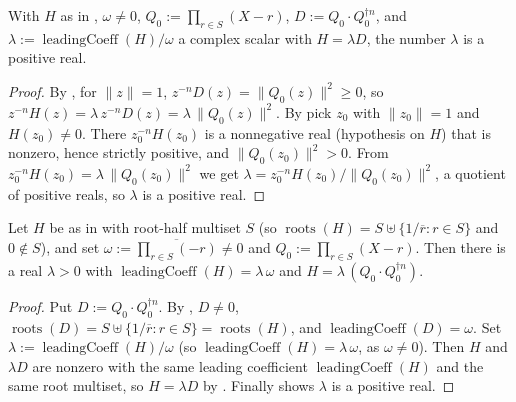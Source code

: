 \begin{lemma}
    \label{lem:fr-positive-multiple-lambda}
    \leanok
    With $H$ as in , $\omega \neq 0$, $Q_0 := \prod_{r\in S}
    (X-r)$, $D := Q_0\cdot Q_0^{\dagger n}$, and $\lambda :=
    \operatorname{leadingCoeff}(H)/\omega$ a complex scalar with $H = \lambda D$,
    the number $\lambda$ is a positive real.
\end{lemma}
\begin{proof}
    By , for $\|z\| = 1$, $z^{-n}D(z)
    = \|Q_0(z)\|^2 \ge 0$, so $z^{-n}H(z) = \lambda\,z^{-n}D(z)
    = \lambda\,\|Q_0(z)\|^2$. By  pick $z_0$
    with $\|z_0\| = 1$ and $H(z_0) \neq 0$. There $z_0^{-n}H(z_0)$ is a
    nonnegative real (hypothesis on $H$) that is nonzero, hence strictly
    positive, and $\|Q_0(z_0)\|^2 > 0$. From
    $z_0^{-n}H(z_0) = \lambda\,\|Q_0(z_0)\|^2$ we get
    $\lambda = z_0^{-n}H(z_0)/\|Q_0(z_0)\|^2$, a quotient of positive reals, so
    $\lambda$ is a positive real.
\end{proof}

\begin{lemma}
    \label{lem:fr-positive-multiple}
    \leanok
    Let $H$ be as in  with root-half multiset $S$ (so
    $\operatorname{roots}(H) = S \uplus \{1/\overline{r} : r \in S\}$ and
    $0 \notin S$), and set $\omega := \overline{\prod_{r \in S}(-r)} \neq 0$ and
    $Q_0 := \prod_{r \in S}(X - r)$. Then there is a real $\lambda > 0$ with
    $\operatorname{leadingCoeff}(H) = \lambda\,\omega$ and
    $H = \lambda\,(Q_0\cdot Q_0^{\dagger n})$.
\end{lemma}
\begin{proof}
    Put $D := Q_0\cdot Q_0^{\dagger n}$. By ,
    $D \neq 0$, $\operatorname{roots}(D) = S \uplus \{1/\overline{r} : r \in S\}
    = \operatorname{roots}(H)$, and $\operatorname{leadingCoeff}(D) = \omega$.
    Set $\lambda := \operatorname{leadingCoeff}(H)/\omega$ (so
    $\operatorname{leadingCoeff}(H) = \lambda\,\omega$, as $\omega \neq 0$). Then
    $H$ and $\lambda D$ are nonzero with the same leading coefficient
    $\operatorname{leadingCoeff}(H)$ and the same root multiset, so $H = \lambda D$
    by . Finally
     shows $\lambda$ is a positive real.
\end{proof}

